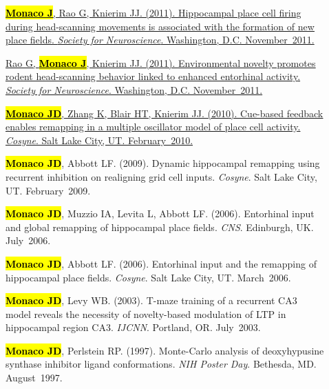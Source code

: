 \documentclass[10pt]{article}
\newcommand{\itemtitle}[1]{{\color{hopkinsblue}\ul{#1}}}
\newcommand{\unpubtitle}[1]{{\color{hopkinsblue} #1}}
\newcommand{\joehl}[1]{\hl{\textbf{#1}}}
\begin{document}
\begin{description}
  \item[\quad]
    \href{https://www.abstractsonline.com/Plan/ViewAbstract.aspx?sKey=c48e9f5f-1274-4486-85bf-38ee591629e1&cKey=190bd951-c183-428d-a4c5-01eb61556d79&mKey=8334BE29-8911-4991-8C31-32B32DD5E6C8}
    {\joehl{Monaco J}, Rao G, Knierim JJ. (2011). \itemtitle{Hippocampal place
        cell firing during head-scanning movements is associated with the formation
    of new place fields}. \emph{Society for Neuroscience}. Washington, D.C. November~2011.}
  \item[\quad]
    \href{https://www.abstractsonline.com/Plan/ViewAbstract.aspx?sKey=c48e9f5f-1274-4486-85bf-38ee591629e1&cKey=3ec26e6f-8c59-4be2-bad3-e1572d75e07e&mKey=8334BE29-8911-4991-8C31-32B32DD5E6C8}
    {Rao G, \joehl{Monaco J}, Knierim JJ. (2011). \itemtitle{Environmental
        novelty promotes rodent head-scanning behavior linked to enhanced entorhinal
      activity}. \emph{Society for Neuroscience}. Washington,
    D.C. November~2011.}
  \item[\quad]
    \href{https://www.frontiersin.org/10.3389/conf.fnins.2010.03.00192/event_abstract}
    {\joehl{Monaco JD}, Zhang K, Blair HT, Knierim JJ. (2010).
      \itemtitle{Cue-based feedback enables remapping in a multiple oscillator
      model of place cell activity}. \emph{Cosyne}. Salt Lake City, UT.
    February~2010.}
  \item[\quad] \joehl{Monaco JD}, Abbott LF. (2009). \unpubtitle{Dynamic
      hippocampal remapping using recurrent inhibition on realigning grid cell
    inputs}. \emph{Cosyne}. Salt Lake City, UT. February~2009.
  \item[\quad] \joehl{Monaco JD}, Muzzio IA, Levita L, Abbott LF. (2006).
    \unpubtitle{Entorhinal input and global remapping of hippocampal place
    fields}. \emph{CNS}. Edinburgh, UK. July~2006.
  \item[\quad] \joehl{Monaco JD}, Abbott LF. (2006). \unpubtitle{Entorhinal
    input and the remapping of hippocampal place fields}. \emph{Cosyne}. Salt Lake
    City, UT. March~2006.
  \item[\quad] \joehl{Monaco JD}, Levy WB. (2003). \unpubtitle{T-maze training
      of a recurrent CA3 model reveals the necessity of novelty-based modulation of
    LTP in hippocampal region CA3}. \emph{IJCNN}. Portland, OR. July~2003.
  \item[\quad] \joehl{Monaco JD}, Perlstein RP. (1997). \unpubtitle{Monte-Carlo
    analysis of deoxyhypusine synthase inhibitor ligand conformations}. \emph{NIH
    Poster Day}. Bethesda, MD. August~1997.
\end{description}
\end{document}
